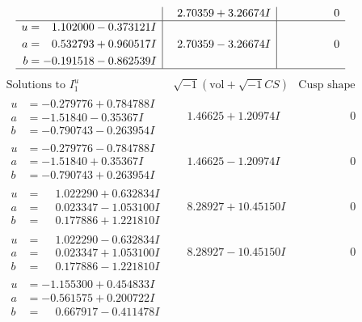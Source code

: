 \documentclass[1p]{elsarticle_modified}
\theoremstyle{definition}
\newcommand{\I}{\sqrt{-1}}
\begin{document}
$$\begin{array}{c|c|c}
 & \phantom{-}2.70359 + 3.26674 I & \phantom{-0.000000 } 0 \\ \hline\begin{aligned}
u &= \phantom{-}1.102000 - 0.373121 I \\
a &= \phantom{-}0.532793 + 0.960517 I \\
b &= -0.191518 - 0.862539 I\end{aligned}
 & \phantom{-}2.70359 - 3.26674 I & \phantom{-0.000000 } 0\\
 \hline 
 \end{array}$$\newpage$$\begin{array}{c|c|c}  
\text{Solutions to }I^u_{1}& \I (\text{vol} + \sqrt{-1}CS) & \text{Cusp shape}\\
 \hline 
\begin{aligned}
u &= -0.279776 + 0.784788 I \\
a &= -1.51840 - 0.35367 I \\
b &= -0.790743 - 0.263954 I\end{aligned}
 & \phantom{-}1.46625 + 1.20974 I & \phantom{-0.000000 } 0 \\ \hline\begin{aligned}
u &= -0.279776 - 0.784788 I \\
a &= -1.51840 + 0.35367 I \\
b &= -0.790743 + 0.263954 I\end{aligned}
 & \phantom{-}1.46625 - 1.20974 I & \phantom{-0.000000 } 0 \\ \hline\begin{aligned}
u &= \phantom{-}1.022290 + 0.632834 I \\
a &= \phantom{-}0.023347 - 1.053100 I \\
b &= \phantom{-}0.177886 + 1.221810 I\end{aligned}
 & \phantom{-}8.28927 + 10.45150 I & \phantom{-0.000000 } 0 \\ \hline\begin{aligned}
u &= \phantom{-}1.022290 - 0.632834 I \\
a &= \phantom{-}0.023347 + 1.053100 I \\
b &= \phantom{-}0.177886 - 1.221810 I\end{aligned}
 & \phantom{-}8.28927 - 10.45150 I & \phantom{-0.000000 } 0 \\ \hline\begin{aligned}
u &= -1.155300 + 0.454833 I \\
a &= -0.561575 + 0.200722 I \\
b &= \phantom{-}0.667917 - 0.411478 I\end{aligned}

\end{array}$$
\end{document}
